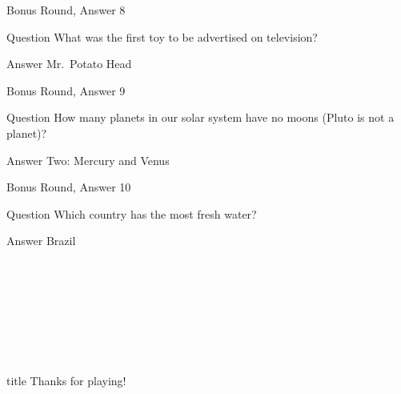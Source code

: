 \documentclass[11pt]{beamer}
\begin{document}
\begin{frame}[t]{Bonus Round, Answer 8}
\vspace{2em}
\begin{block}{Question}
What was the first toy to be advertised on television\@?
\end{block}
\pause{}
\begin{block}{Answer}
Mr.\ Potato Head
\end{block}
\end{frame}
    

\begin{frame}[t]{Bonus Round, Answer 9}
\vspace{2em}
\begin{block}{Question}
How many planets in our solar system have no moons (Pluto is not a planet)\@?
\end{block}
\pause{}
\begin{block}{Answer}
Two: Mercury and Venus
\end{block}
\end{frame}
    

\begin{frame}[t]{Bonus Round, Answer 10}
\vspace{2em}
\begin{block}{Question}
Which country has the most fresh water\@?
\end{block}
\pause{}
\begin{block}{Answer}
Brazil
\end{block}
\end{frame}
    

\section*{\ }
\subsection*{\ }
\begingroup{}
\begin{frame}
\vfill{}
\centering{}
\begin{beamercolorbox}[sep=8pt,center,shadow=true,rounded=true]{title}
Thanks for playing!\par%
\end{beamercolorbox}
\vfill{}
\end{frame}
\endgroup{}
\end{document}
